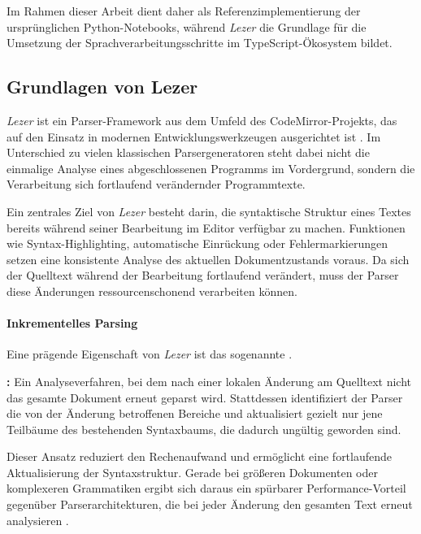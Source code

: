 Im Rahmen dieser Arbeit dient \emph{} daher als Referenzimplementierung der ursprünglichen Python-Notebooks, während \emph{Lezer} die Grundlage für die Umsetzung der Sprachverarbeitungsschritte im TypeScript-Ökosystem bildet.

\subsection{Grundlagen von Lezer}
\label{subsec:lezer_basics}

\emph{Lezer} ist ein Parser-Framework aus dem Umfeld des CodeMirror-Projekts, das auf den Einsatz in modernen Entwicklungswerkzeugen ausgerichtet ist \autocite{lezer_docs}. Im Unterschied zu vielen klassischen Parsergeneratoren steht dabei nicht die einmalige Analyse eines abgeschlossenen Programms im Vordergrund, sondern die Verarbeitung sich fortlaufend verändernder Programmtexte.

Ein zentrales Ziel von \emph{Lezer} besteht darin, die syntaktische Struktur eines Textes bereits während seiner Bearbeitung im Editor verfügbar zu machen. Funktionen wie Syntax-Highlighting, automatische Einrückung oder Fehlermarkierungen setzen eine konsistente Analyse des aktuellen Dokumentzustands voraus. Da sich der Quelltext während der Bearbeitung fortlaufend verändert, muss der Parser diese Änderungen ressourcenschonend verarbeiten können.

\paragraph{Inkrementelles Parsing}

Eine prägende Eigenschaft von \emph{Lezer} ist das sogenannte \emph{}.

\begin{definition}
\label{def:inkrementelles-parsing}
\textbf{:}
Ein Analyseverfahren, bei dem nach einer lokalen Änderung am Quelltext nicht das gesamte Dokument erneut geparst wird. Stattdessen identifiziert der Parser die von der Änderung betroffenen Bereiche und aktualisiert gezielt nur jene Teilbäume des bestehenden Syntaxbaums, die dadurch ungültig geworden sind.
\end{definition}

Dieser Ansatz reduziert den Rechenaufwand und ermöglicht eine fortlaufende Aktualisierung der Syntaxstruktur. Gerade bei größeren Dokumenten oder komplexeren Grammatiken ergibt sich daraus ein spürbarer Performance-Vorteil gegenüber Parserarchitekturen, die bei jeder Änderung den gesamten Text erneut analysieren \autocite{haverbeke2019lezer}.

